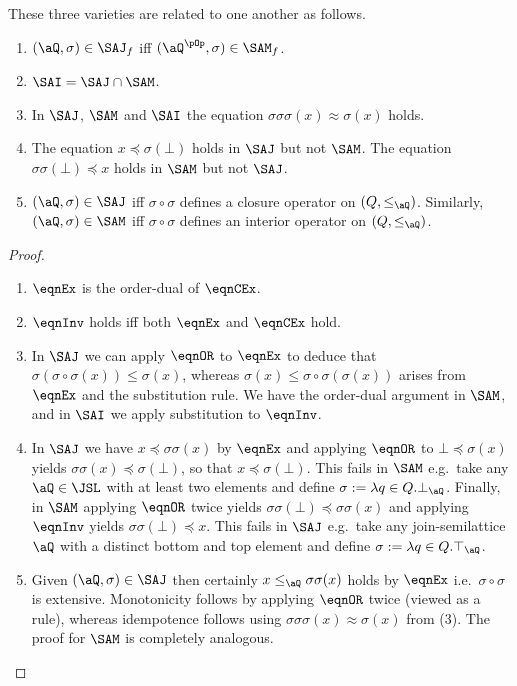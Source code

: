 \documentclass{article}
\begin{document}
\bigskip

\noindent
These three varieties are related to one another as follows.

\begin{lemma}
\label{lem:sa_vars_basic_relationship}
\item
\begin{enumerate}
\item
$(\aQ,\sigma) \in \SAJ_f$ iff $(\aQ^{\pOp},\sigma) \in \SAM_f$.
\item
$\SAI = \SAJ \cap \SAM$.
\item
In $\SAJ$, $\SAM$ and $\SAI$ the equation $\sigma\sigma\sigma(x) \approx \sigma(x)$ holds.
\item
The equation $x \preccurlyeq \sigma(\bot)$ holds in $\SAJ$ but not $\SAM$. The equation $\sigma\sigma(\bot) \preccurlyeq x$ holds in $\SAM$ but not $\SAJ$.
\item
$(\aQ,\sigma) \in \SAJ$ iff $\sigma \circ \sigma$ defines a closure operator on $(Q,\leq_\aQ)$. Similarly, $(\aQ,\sigma) \in \SAM$ iff $\sigma \circ \sigma$ defines an interior operator on $(Q,\leq_\aQ)$.
\end{enumerate}
\end{lemma}

\begin{proof}
\item
\begin{enumerate}
\item
$\eqnEx$ is the order-dual of $\eqnCEx$.
\item
$\eqnInv$ holds iff both $\eqnEx$ and $\eqnCEx$ hold.
\item
In $\SAJ$ we can apply $\eqnOR$ to $\eqnEx$ to deduce that $\sigma(\sigma \circ \sigma(x)) \leq \sigma(x)$, whereas $\sigma(x) \leq \sigma \circ \sigma(\sigma(x))$ arises from $\eqnEx$ and the substitution rule. We have the order-dual argument in $\SAM$, and in $\SAI$ we apply substitution to $\eqnInv$.
\item
In $\SAJ$ we have $x \preccurlyeq \sigma\sigma(x)$ by $\eqnEx$ and applying $\eqnOR$ to $\bot \preccurlyeq \sigma(x)$ yields $\sigma\sigma(x) \preccurlyeq \sigma(\bot)$, so that $x \preccurlyeq \sigma(\bot)$. This fails in $\SAM$ e.g.\ take any $\aQ \in \JSL$ with at least two elements and define $\sigma := \lambda q \in Q.\bot_\aQ$. Finally, in $\SAM$ applying $\eqnOR$ twice yields $\sigma\sigma(\bot) \preccurlyeq \sigma\sigma(x)$ and applying  $\eqnInv$ yields $\sigma\sigma(\bot) \preccurlyeq x$. This fails in $\SAJ$ e.g.\ take any join-semilattice $\aQ$ with a distinct bottom and top element and define $\sigma := \lambda q \in Q.\top_\aQ$.
\item
Given $(\aQ,\sigma) \in \SAJ$ then certainly $x \leq_\aQ \sigma\sigma(x)$ holds by $\eqnEx$ i.e.\ $\sigma \circ \sigma$ is extensive. Monotonicity follows by applying $\eqnOR$ twice (viewed as a rule), whereas idempotence follows using $\sigma\sigma\sigma(x) \approx \sigma(x)$ from (3). The proof for $\SAM$ is completely analogous.
\end{enumerate}
\end{proof}
\end{document}
